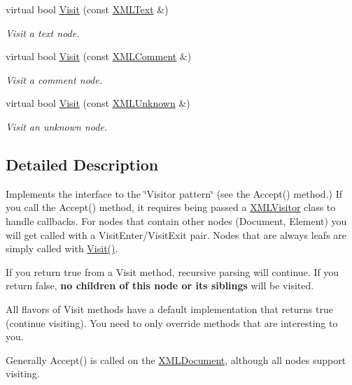 \begin{DoxyCompactItemize}
virtual bool \hyperlink{classtinyxml2_1_1_x_m_l_visitor_af30233565856480ea48b6fa0d6dec65b}{Visit} (const \hyperlink{classtinyxml2_1_1_x_m_l_text}{X\+M\+L\+Text} \&)
\begin{DoxyCompactList}\small\item\em Visit a text node. \end{DoxyCompactList}\item 
virtual bool \hyperlink{classtinyxml2_1_1_x_m_l_visitor_acc8147fb5a85f6c65721654e427752d7}{Visit} (const \hyperlink{classtinyxml2_1_1_x_m_l_comment}{X\+M\+L\+Comment} \&)
\begin{DoxyCompactList}\small\item\em Visit a comment node. \end{DoxyCompactList}\item 
virtual bool \hyperlink{classtinyxml2_1_1_x_m_l_visitor_a14e4748387c34bf53d24e8119bb1f292}{Visit} (const \hyperlink{classtinyxml2_1_1_x_m_l_unknown}{X\+M\+L\+Unknown} \&)
\begin{DoxyCompactList}\small\item\em Visit an unknown node. \end{DoxyCompactList}\end{DoxyCompactItemize}


\subsection{Detailed Description}
Implements the interface to the \char`\"{}\+Visitor pattern\char`\"{} (see the Accept() method.) If you call the Accept() method, it requires being passed a \hyperlink{classtinyxml2_1_1_x_m_l_visitor}{X\+M\+L\+Visitor} class to handle callbacks. For nodes that contain other nodes (Document, Element) you will get called with a Visit\+Enter/\+Visit\+Exit pair. Nodes that are always leafs are simply called with \hyperlink{classtinyxml2_1_1_x_m_l_visitor_adc75bd459fc7ba8223b50f0616767f9a}{Visit()}.

If you return \textquotesingle{}true\textquotesingle{} from a Visit method, recursive parsing will continue. If you return false, {\bfseries no children of this node or its siblings} will be visited.

All flavors of Visit methods have a default implementation that returns \textquotesingle{}true\textquotesingle{} (continue visiting). You need to only override methods that are interesting to you.

Generally Accept() is called on the \hyperlink{classtinyxml2_1_1_x_m_l_document}{X\+M\+L\+Document}, although all nodes support visiting.

